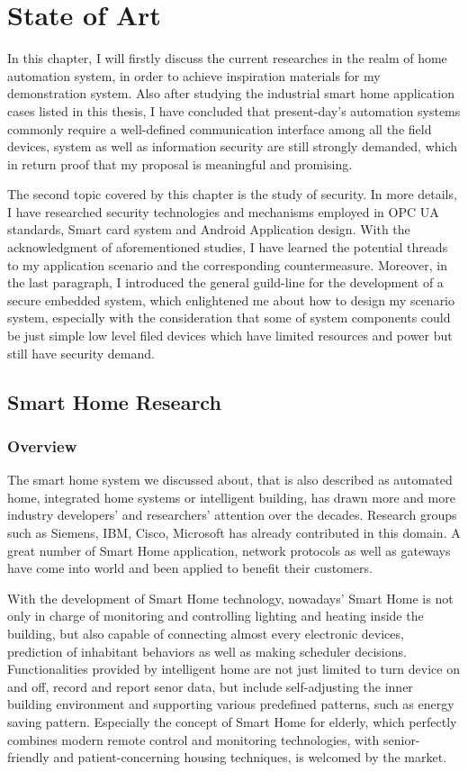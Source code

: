 \chapter{State of Art}
In this chapter, I will firstly discuss the current researches in the realm of home automation system, in order to achieve inspiration materials for my demonstration system. Also after studying the industrial smart home application cases listed in this thesis, I have concluded that present-day's automation systems commonly require a well-defined communication interface among all the field devices, system as well as information security are still strongly demanded, which in return proof that my proposal is meaningful and promising.  

The second topic covered by this chapter is the study of security. In more details, I have researched security   technologies and mechanisms employed in OPC UA standards, Smart card system and Android Application design. With the acknowledgment of aforementioned studies, I have learned the potential threads to my application scenario and the corresponding countermeasure. Moreover, in the last paragraph, I introduced  the general guild-line for the development of a secure embedded system, which enlightened me about how to design my scenario system, especially with the consideration that some of system components could be just simple low level filed devices which have limited resources and power but still have security demand.
 
\section{Smart Home Research}
\subsection{Overview}
The smart home system we discussed about, that is also described as automated home, integrated home systems or intelligent building\cite{smart_home_concept}, has drawn more and more industry developers' and researchers' attention over the decades. Research groups such as Siemens, IBM, Cisco, Microsoft\cite{smart_home_research} has already contributed in this domain. A great number of Smart Home application, network protocols as well as gateways\cite{smart_home_for_gateway} have come into world and been applied to benefit their customers.

With the development of Smart Home technology, nowadays' Smart Home is not only in charge of monitoring and controlling lighting and heating inside the building, but also capable of connecting almost every electronic devices, prediction of inhabitant behaviors as well as making scheduler decisions. Functionalities provided by intelligent home are not just limited to turn device on and off, record and report senor data, but include self-adjusting the inner building environment and supporting various predefined patterns, such as energy saving pattern. Especially the concept of Smart Home for elderly\cite{smart_home_for_old}, which perfectly combines modern remote control and monitoring technologies, with senior-friendly and patient-concerning housing techniques, is welcomed by the market. 

